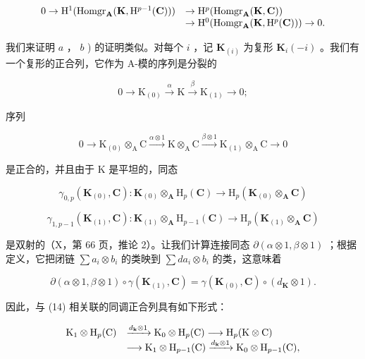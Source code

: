 \[
\begin{array}{r l} 0 \to \mathrm{H} ^ {1} (\operatorname{Homgr} _ {\mathbf {A}} (\mathbf {K}, \mathrm{H} ^ {p - 1} (\mathbf {C}))) & \to \mathrm{H} ^ {p} (\operatorname{Homgr} _ {\mathbf {A}} (\mathbf {K}, \mathbf {C})) \\ & \to \mathrm{H} ^ {0} (\operatorname{Homgr} _ {\mathbf {A}} (\mathbf {K}, \mathrm{H} ^ {p} (\mathbf {C}))) \to 0. \end{array}
\]

我们来证明 \(a\) ， \(b\) ) 的证明类似。对每个 \(i\) ，记 \(\mathbf{K}_{(i)}\) 为复形 \(\mathbf{K}_i(-i)\) 。我们有一个复形的正合列，它作为 A-模的序列是分裂的

\[
0 \rightarrow \mathrm{K} _ {(0)} \xrightarrow {\alpha} \mathrm{K} \xrightarrow {\beta} \mathrm{K} _ {(1)} \rightarrow 0;
\]

序列

\[
0 \longrightarrow \mathrm{K} _ {(0)} \otimes_ {\mathrm{A}} \mathrm{C} \xrightarrow {\alpha \otimes 1} \mathrm{K} \otimes_ {\mathrm{A}} \mathrm{C} \xrightarrow {\beta \otimes 1} \mathrm{K} _ {(1)} \otimes_ {\mathrm{A}} \mathrm{C} \longrightarrow 0\tag{14}
\]

是正合的，并且由于 K 是平坦的，同态

\[
\gamma_ {0, p} (\mathbf {K} _ {(0)}, \mathbf {C}): \mathbf {K} _ {(0)} \otimes_ {\mathbf {A}} \mathrm{H} _ {p} (\mathbf {C}) \rightarrow \mathrm{H} _ {p} (\mathbf {K} _ {(0)} \otimes_ {\mathbf {A}} \mathbf {C})
\]

\[
\gamma_ {1, p - 1} (\mathbf {K} _ {(1)}, \mathbf {C}): \mathbf {K} _ {(1)} \otimes_ {\mathbf {A}} \mathrm{H} _ {p - 1} (\mathbf {C}) \rightarrow \mathrm{H} _ {p} (\mathbf {K} _ {(1)} \otimes_ {\mathbf {A}} \mathbf {C})
\]

是双射的（X，第 66 页，推论 2）。让我们计算连接同态 \(\partial (\alpha \otimes 1, \beta \otimes 1)\) ；根据定义，它把闭链 \(\sum a_i \otimes b_i\) 的类映到 \(\sum da_i \otimes b_i\) 的类，这意味着

\[
\partial (\alpha \otimes 1, \beta \otimes 1) \circ \gamma (\mathbf {K} _ {(1)}, \mathbf {C}) = \gamma (\mathbf {K} _ {(0)}, \mathbf {C}) \circ (d _ {\mathbf {K}} \otimes 1).
\]

因此，与 (14) 相关联的同调正合列具有如下形式：

\[
\begin{array}{r l} \mathrm{K} _ {1} \otimes \mathrm{H} _ {p} (\mathrm{C}) & \xrightarrow {d _ {\mathbf {k}} \otimes 1} \mathrm{K} _ {0} \otimes \mathrm{H} _ {p} (\mathrm{C}) \longrightarrow \mathrm{H} _ {p} (\mathrm{K} \otimes \mathrm{C}) \\ & \longrightarrow \mathrm{K} _ {1} \otimes \mathrm{H} _ {p - 1} (\mathrm{C}) \xrightarrow {d _ {\mathbf {k}} \otimes 1} \mathrm{K} _ {0} \otimes \mathrm{H} _ {p - 1} (\mathrm{C}), \end{array}
\]

